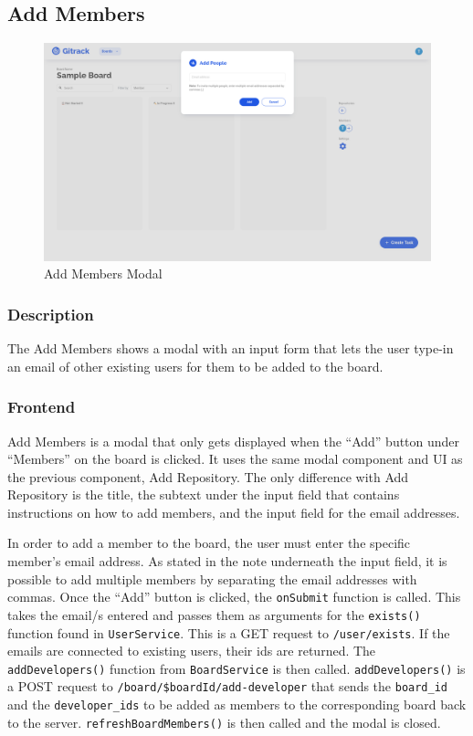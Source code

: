 \documentclass{article}
\def\code#1{\texttt{#1}}
\begin{document}
\subsection{Add Members}
\begin{figure}[H]
	\includegraphics[width=1\textwidth]{add-member}\par\vspace{0.5cm}
	\caption{Add Members Modal}
	\label{fig:add-member}
\end{figure}
\subsubsection{Description}
The Add Members shows a modal with an input form that lets the user type-in an
email of other existing users for them to be added to the board.

\subsubsection{Frontend}
Add Members is a modal that only gets displayed when the “Add” button under
“Members” on the board is clicked. It uses the same modal component and UI as
the previous component, Add Repository. The only difference with Add Repository
is the title, the subtext under the input field that contains instructions on
how to add members, and the input field for the email addresses.

In order to add a member to the board, the user must enter the specific member’s
email address. As stated in the note underneath the input field, it is possible
to add multiple members by separating the email addresses with commas. Once the
“Add” button is clicked, the \code{onSubmit} function is called. This takes the
email/s entered and passes them as arguments for the \code{exists()} function
found in \code{UserService}. This is a GET request to \code{/user/exists}. If
the emails are connected to existing users, their ids are returned. The
\code{addDevelopers()} function from \code{BoardService} is then called.
\code{addDevelopers()} is a POST request to
\code{/board/\${boardId}/add-developer} that sends the \code{board\_id} and the
\code{developer\_ids} to be added as members to the corresponding board back to
the server. \code{refreshBoardMembers()} is then called and the modal is closed.
\end{document}
